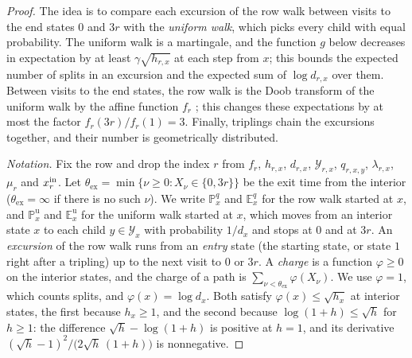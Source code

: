 \begin{proof}
The idea is to compare each excursion of the row walk between visits to
the end states \(0\) and \(3r\) with the \emph{uniform walk}, which picks
every child with equal probability. The uniform walk is a martingale, and
the function \(g\) below decreases in expectation by at least
\(\gamma\sqrt{h_{r,x}}\) at each step from \(x\); this bounds the
expected number of splits in an excursion and the expected sum of
\(\log d_{r,x}\) over them. Between visits to the end states, the row
walk is the Doob transform of the uniform walk by the affine function
\(f_r\) \citep[Section~17.6.1]{LevinPeres17}; this changes these
expectations by at most the factor \(f_r(3r)/f_r(1)=3\). Finally,
triplings chain the excursions together, and their number is
geometrically distributed.

\emph{Notation.} Fix the row and drop the index \(r\) from \(f_r\),
\(h_{r,x}\), \(d_{r,x}\), \(\mathcal Y_{r,x}\), \(q_{r,x,y}\),
\(\lambda_{r,x}\), \(\mu_r\) and \(x^{\mathrm{in}}_r\). Let
\(\theta_{\mathrm{ex}}=\min\{\nu\ge0:X_\nu\in\{0,3r\}\}\) be the exit
time from the interior (\(\theta_{\mathrm{ex}}=\infty\) if there is no
such \(\nu\)). We write \(\mathbb P^q_x\) and \(\mathbb E^q_x\) for the
row walk started at \(x\), and \(\mathbb P^{\mathrm u}_x\) and
\(\mathbb E^{\mathrm u}_x\) for the uniform walk started at \(x\), which
moves from an interior state \(x\) to each child \(y\in\mathcal Y_x\)
with probability \(1/d_x\) and stops at \(0\) and at \(3r\). An
\emph{excursion} of the row walk runs from an \emph{entry} state (the
starting state, or state \(1\) right after a tripling) up to the next
visit to \(0\) or \(3r\). A \emph{charge} is a function \(\varphi\ge0\)
on the interior states, and the charge of a path is
\(\sum_{\nu<\theta_{\mathrm{ex}}}\varphi(X_\nu)\). We use \(\varphi=1\),
which counts splits, and \(\varphi(x)=\log d_x\). Both satisfy
\(\varphi(x)\le\sqrt{h_x}\) at interior states, the first because
\(h_x\ge1\), and the second because \(\log(1+h)\le\sqrt h\) for
\(h\ge1\): the difference \(\sqrt h-\log(1+h)\) is positive at \(h=1\),
and its derivative \((\sqrt h-1)^2/\bigl(2\sqrt h\,(1+h)\bigr)\) is
nonnegative.


\end{proof}
